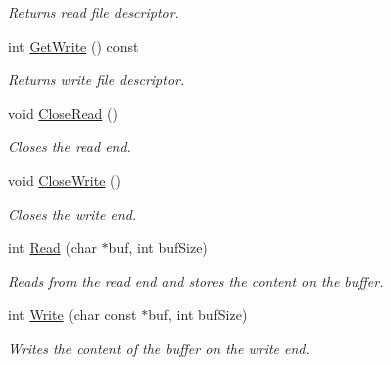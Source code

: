\begin{DoxyCompactItemize}
\begin{DoxyCompactList}\small\item\em Returns read file descriptor. \end{DoxyCompactList}\item 
\hypertarget{class_common_1_1_pipe_a8700c04b38ae865e1b94aafee03258b7}{int \hyperlink{class_common_1_1_pipe_a8700c04b38ae865e1b94aafee03258b7}{Get\-Write} () const }\label{class_common_1_1_pipe_a8700c04b38ae865e1b94aafee03258b7}

\begin{DoxyCompactList}\small\item\em Returns write file descriptor. \end{DoxyCompactList}\item 
\hypertarget{class_common_1_1_pipe_ae03641ee676afb1b1494523262d0ef62}{void \hyperlink{class_common_1_1_pipe_ae03641ee676afb1b1494523262d0ef62}{Close\-Read} ()}\label{class_common_1_1_pipe_ae03641ee676afb1b1494523262d0ef62}

\begin{DoxyCompactList}\small\item\em Closes the read end. \end{DoxyCompactList}\item 
\hypertarget{class_common_1_1_pipe_ad04e98f2fe8628fbd35b1f2ad70590b4}{void \hyperlink{class_common_1_1_pipe_ad04e98f2fe8628fbd35b1f2ad70590b4}{Close\-Write} ()}\label{class_common_1_1_pipe_ad04e98f2fe8628fbd35b1f2ad70590b4}

\begin{DoxyCompactList}\small\item\em Closes the write end. \end{DoxyCompactList}\item 
int \hyperlink{class_common_1_1_pipe_a9aeb05035180bec14dc7251c4a4dbc1c}{Read} (char $\ast$buf, int buf\-Size)
\begin{DoxyCompactList}\small\item\em Reads from the read end and stores the content on the buffer. \end{DoxyCompactList}\item 
int \hyperlink{class_common_1_1_pipe_ae52a61f9bf69495df9dcdbdd3d4ec01d}{Write} (char const $\ast$buf, int buf\-Size)
\begin{DoxyCompactList}\small\item\em Writes the content of the buffer on the write end. \end{DoxyCompactList}\end{DoxyCompactItemize}


